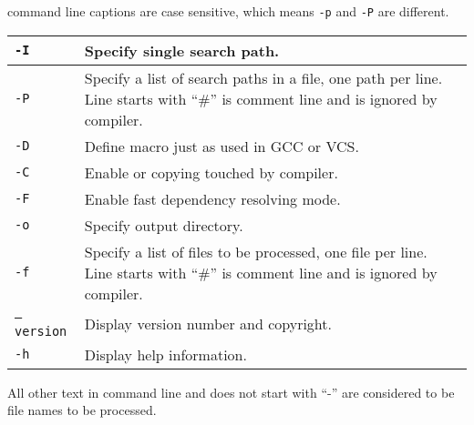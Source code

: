 \mhdlc{} command line captions are case sensitive, which means \texttt{-p} and 
\texttt{-P} are different. 


\tablelasttail{\hline}

\begin{center}
\begin{supertabular}{|l|p{90mm}|}
\texttt{-I} & 
Specify single search path.\\
\hline

\texttt{-P} & 
Specify a list of search paths in a file, one path per line. 
Line starts with ``\#'' is comment line and is ignored by compiler.\\
\hline

\texttt{-D} & 
Define macro just as used in GCC or VCS. \\
\hline

\texttt{-C} & 
Enable \vlog{} or \sv{} copying touched by compiler. \\
\hline

\texttt{-F} & 
Enable fast dependency resolving mode. \\
\hline

\texttt{-o} & 
Specify output directory. \\
\hline

\texttt{-f} & 
Specify a list of files to be processed, one file per line.  
Line starts with ``\#'' is comment line and is ignored by compiler.\\
\hline

\texttt{--version} &
Display version number and copyright.\\
\hline

\texttt{-h} & 
Display help information.\\
\hline

\end{supertabular}
\end{center}

All other text in command line and does not start with ``-'' are considered to be file names
to be processed. 

